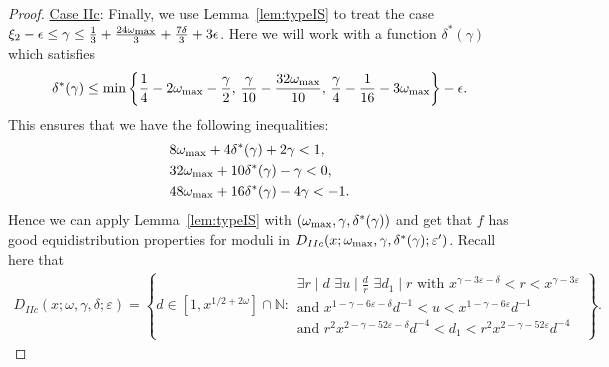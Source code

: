 \documentclass{amsart}
\numberwithin{equation}{section}
\begin{document}
\begin{proof}
\underline{Case IIc}:  Finally, we use  Lemma~\ref{lem:typeIS} to treat the case $\xi_2 -\epsilon \leq \gamma \leq  \tfrac{1}{3}+\tfrac{24\omega_{\begin{scriptsize}
\mbox{max}\end{scriptsize}}}{3} +\tfrac{7\delta}{3}  +3\epsilon$.  
Here we will work with a function $\delta^*(\gamma)$ which satisfies
$$\delta^*(\gamma) \leq  \min\left\{\frac{1}{4}-2\omega_{\begin{scriptsize}
\mbox{max}\end{scriptsize}} -\frac{\gamma}{2} , \, \frac{\gamma}{10} -\frac{32\omega_{\begin{scriptsize}
\mbox{max}\end{scriptsize}}}{10}  , \,
\frac{\gamma}{4} -\frac{1}{16} -3\omega_{\begin{scriptsize}
\mbox{max}\end{scriptsize}} \right\} -\epsilon.$$
This ensures that we have the following inequalities:
\begin{align*}
&8\omega_{\begin{scriptsize}
\mbox{max}\end{scriptsize}} +4\delta^*(\gamma) + 2\gamma < 1, \\
&32\omega_{\begin{scriptsize}
\mbox{max}\end{scriptsize}}  + 10 \delta^*(\gamma) -\gamma<0, \\
&48\omega_{\begin{scriptsize}
\mbox{max}\end{scriptsize}}  +  16 \delta^*(\gamma)  -4\gamma  < -1.
\end{align*}
Hence we can apply Lemma~\ref{lem:typeIS} with $(\omega_{\begin{scriptsize}
\mbox{max}
\end{scriptsize}}, \gamma, \delta^*(\gamma))$ and get that $f$ has good equidistribution properties for moduli in $D_{IIc}(x;\omega_{\begin{scriptsize}
\mbox{max}
\end{scriptsize}},\gamma,\delta^*(\gamma);\varepsilon')$. Recall here that 
 \begin{align*}
D_{IIc}(x;\omega,\gamma,\delta;\varepsilon) = \left\{d \in  [1, x^{1/2+2\omega}]\cap \mathbb{N}:  \begin{array}{l} 
\exists r \mid d \,\, \exists u \mid \frac{d}{r} \,\, \exists d_1 \mid r \mbox{ with } x^{\gamma -3\varepsilon-\delta} < r < x^{\gamma - 3\varepsilon} \\ \mbox{and }    x^{1-\gamma-6\varepsilon-\delta}   d^{-1} < u < x^{1-\gamma-6\varepsilon}   d^{-1} \\ 
\mbox{and }  r^2 x^{2-\gamma-52\varepsilon -\delta}  d^{-4} < d_1 <  r^2 x^{2-\gamma-52\varepsilon}  d^{-4}
\end{array}\right\}.
\end{align*}


\end{proof}
\end{document}
